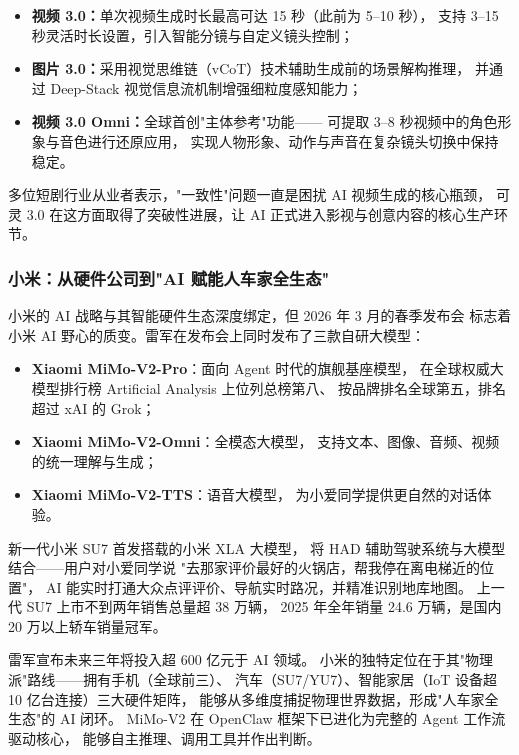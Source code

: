 \begin{itemize}
  \item \textbf{视频 3.0：}单次视频生成时长最高可达 15 秒（此前为 5--10 秒），
    支持 3--15 秒灵活时长设置，引入智能分镜与自定义镜头控制；
  \item \textbf{图片 3.0：}采用视觉思维链（vCoT）技术辅助生成前的场景解构推理，
    并通过 Deep-Stack 视觉信息流机制增强细粒度感知能力；
  \item \textbf{视频 3.0 Omni：}全球首创"主体参考"功能——
    可提取 3--8 秒视频中的角色形象与音色进行还原应用，
    实现人物形象、动作与声音在复杂镜头切换中保持稳定。
\end{itemize}

多位短剧行业从业者表示，"一致性"问题一直是困扰 AI 视频生成的核心瓶颈，
可灵 3.0 在这方面取得了突破性进展，让 AI 正式进入影视与创意内容的核心生产环节。

\subsubsection{小米：从硬件公司到"AI 赋能人车家全生态"}

小米的 AI 战略与其智能硬件生态深度绑定，但 2026 年 3 月的春季发布会
标志着小米 AI 野心的质变。雷军在发布会上同时发布了三款自研大模型：

\begin{itemize}
  \item \textbf{Xiaomi MiMo-V2-Pro}：面向 Agent 时代的旗舰基座模型，
    在全球权威大模型排行榜 Artificial Analysis 上位列总榜第八、
    按品牌排名全球第五，排名超过 xAI 的 Grok；
  \item \textbf{Xiaomi MiMo-V2-Omni}：全模态大模型，
    支持文本、图像、音频、视频的统一理解与生成；
  \item \textbf{Xiaomi MiMo-V2-TTS}：语音大模型，
    为小爱同学提供更自然的对话体验。
\end{itemize}

新一代小米 SU7 首发搭载的小米 XLA 大模型，
将 HAD 辅助驾驶系统与大模型结合——用户对小爱同学说
"去那家评价最好的火锅店，帮我停在离电梯近的位置"，
AI 能实时打通大众点评评价、导航实时路况，并精准识别地库地图。
上一代 SU7 上市不到两年销售总量超 38 万辆，
2025 年全年销量 24.6 万辆，是国内 20 万以上轿车销量冠军。

雷军宣布未来三年将投入超 600 亿元于 AI 领域。
小米的独特定位在于其"物理派"路线——拥有手机（全球前三）、
汽车（SU7/YU7）、智能家居（IoT 设备超 10 亿台连接）三大硬件矩阵，
能够从多维度捕捉物理世界数据，形成"人车家全生态"的 AI 闭环。
MiMo-V2 在 OpenClaw 框架下已进化为完整的 Agent 工作流驱动核心，
能够自主推理、调用工具并作出判断。



